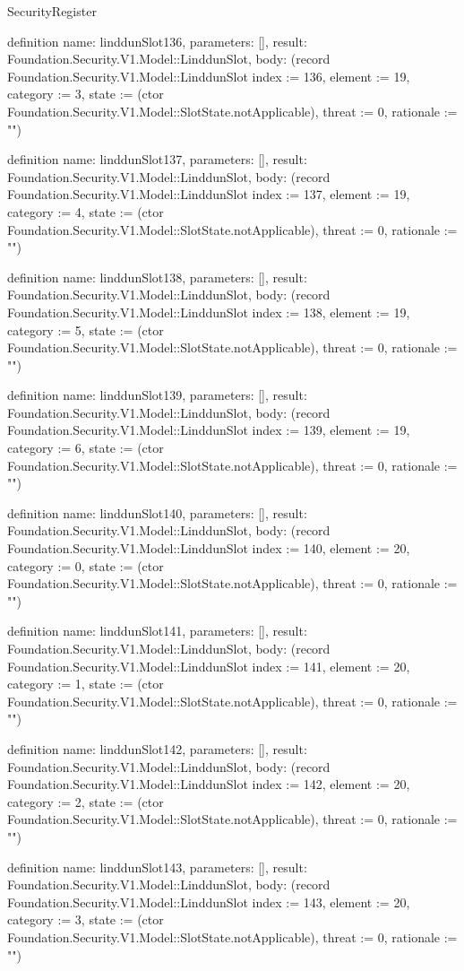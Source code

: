 \begin{lexlean}{SecurityRegister}
\begin{semanticmodule}
definition{
  name: linddunSlot136,
  parameters: [],
  result: Foundation.Security.V1.Model::LinddunSlot,
  body: (record Foundation.Security.V1.Model::LinddunSlot {index := 136, element := 19, category := 3, state := (ctor Foundation.Security.V1.Model::SlotState.notApplicable), threat := 0, rationale := ""})
}

definition{
  name: linddunSlot137,
  parameters: [],
  result: Foundation.Security.V1.Model::LinddunSlot,
  body: (record Foundation.Security.V1.Model::LinddunSlot {index := 137, element := 19, category := 4, state := (ctor Foundation.Security.V1.Model::SlotState.notApplicable), threat := 0, rationale := ""})
}

definition{
  name: linddunSlot138,
  parameters: [],
  result: Foundation.Security.V1.Model::LinddunSlot,
  body: (record Foundation.Security.V1.Model::LinddunSlot {index := 138, element := 19, category := 5, state := (ctor Foundation.Security.V1.Model::SlotState.notApplicable), threat := 0, rationale := ""})
}

definition{
  name: linddunSlot139,
  parameters: [],
  result: Foundation.Security.V1.Model::LinddunSlot,
  body: (record Foundation.Security.V1.Model::LinddunSlot {index := 139, element := 19, category := 6, state := (ctor Foundation.Security.V1.Model::SlotState.notApplicable), threat := 0, rationale := ""})
}

definition{
  name: linddunSlot140,
  parameters: [],
  result: Foundation.Security.V1.Model::LinddunSlot,
  body: (record Foundation.Security.V1.Model::LinddunSlot {index := 140, element := 20, category := 0, state := (ctor Foundation.Security.V1.Model::SlotState.notApplicable), threat := 0, rationale := ""})
}

definition{
  name: linddunSlot141,
  parameters: [],
  result: Foundation.Security.V1.Model::LinddunSlot,
  body: (record Foundation.Security.V1.Model::LinddunSlot {index := 141, element := 20, category := 1, state := (ctor Foundation.Security.V1.Model::SlotState.notApplicable), threat := 0, rationale := ""})
}

definition{
  name: linddunSlot142,
  parameters: [],
  result: Foundation.Security.V1.Model::LinddunSlot,
  body: (record Foundation.Security.V1.Model::LinddunSlot {index := 142, element := 20, category := 2, state := (ctor Foundation.Security.V1.Model::SlotState.notApplicable), threat := 0, rationale := ""})
}

definition{
  name: linddunSlot143,
  parameters: [],
  result: Foundation.Security.V1.Model::LinddunSlot,
  body: (record Foundation.Security.V1.Model::LinddunSlot {index := 143, element := 20, category := 3, state := (ctor Foundation.Security.V1.Model::SlotState.notApplicable), threat := 0, rationale := ""})
}


\end{semanticmodule}
\end{lexlean}
